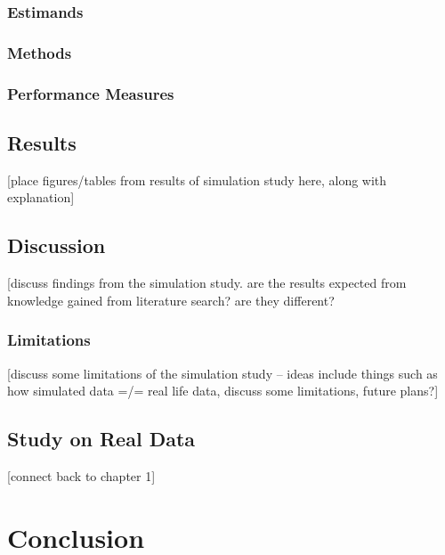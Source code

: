 \documentclass[12pt, twoside]{amherstthesis}
\begin{document}
\hypertarget{estimands}{%
\subsection{Estimands}\label{estimands}}

\hypertarget{methods}{%
\subsection{Methods}\label{methods}}

\hypertarget{performance_measures}{%
\subsection{Performance Measures}\label{performance_measures}}

\hypertarget{results}{%
\section{Results}\label{results}}

{[}place figures/tables from results of simulation study here, along with explanation{]}

\hypertarget{discussion}{%
\section{Discussion}\label{discussion}}

{[}discuss findings from the simulation study. are the results expected from knowledge gained from literature search? are they different?

\hypertarget{limitations}{%
\subsection{Limitations}\label{limitations}}

{[}discuss some limitations of the simulation study -- ideas include things such as how simulated data =/= real life data, discuss some limitations, future plans?{]}

\hypertarget{real_data}{%
\section{Study on Real Data}\label{real_data}}

{[}connect back to chapter 1{]}

\hypertarget{conclusion}{%
\chapter{Conclusion}\label{conclusion}}
\end{document}
